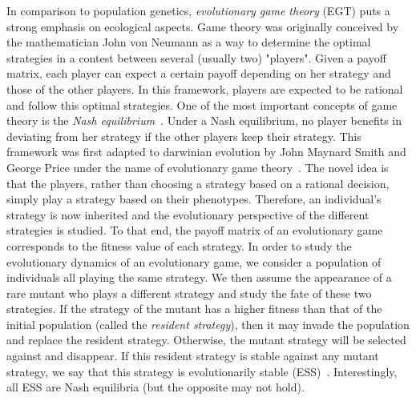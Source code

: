     In comparison to population genetics, \emph{evolutionary game theory} (EGT) puts a strong emphasis on ecological aspects. Game theory was originally conceived by the mathematician John von Neumann as a way to determine the optimal strategies in a contest between several (usually two) "players". Given a payoff matrix, each player can expect a certain payoff depending on her strategy and those of the other players. In this framework, players are expected to be rational and follow this optimal strategies. One of the most important concepts of game theory is the \emph{Nash equilibrium}~\parencite{Nash1950}. Under a Nash equilibrium, no player benefits in deviating from her strategy if the other players keep their strategy. This framework was first adapted to darwinian evolution by John Maynard Smith and George Price under the name of evolutionary game theory~\parencite{MaynardSmith1973}. The novel idea is that the players, rather than choosing a strategy based on a rational decision, simply play a strategy based on their phenotypes. Therefore, an individual's strategy is now inherited and the evolutionary perspective of the different strategies is studied. To that end, the payoff matrix of an evolutionary game corresponds to the fitness value of each strategy. In order to study the evolutionary dynamics of an evolutionary game, we consider a population of individuals all playing the same strategy. We then assume the appearance of a rare mutant who plays a different strategy and study the fate of these two strategies. If the strategy of the mutant has a higher fitness than that of the initial population (called the \emph{resident strategy}), then it may invade the population and replace the resident strategy. Otherwise, the mutant strategy will be selected against and disappear. If this resident strategy is stable against any mutant strategy, we say that this strategy is evolutionarily stable (ESS)~\parencite{MaynardSmith1973}. Interestingly, all ESS are Nash equilibria (but the opposite may not hold).

